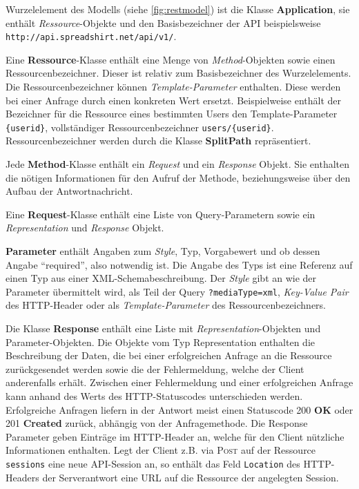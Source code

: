 Wurzelelement des Modells (siehe \cref{fig:restmodel}) ist die Klasse \textbf{Application}, sie enthält \emph{Ressource}-Objekte und den Basisbezeichner der \gls{API} beispielsweise \texttt{\small http://api.spreadshirt.net/api/v1/}. 

Eine \textbf{Ressource}-Klasse enthält eine Menge von \emph{Method}-Objekten sowie einen Ressourcenbezeichner. Dieser ist relativ zum Basisbezeichner des Wurzelelements. Die Ressourcenbezeichner können \emph{Template-Parameter} enthalten. Diese werden bei einer Anfrage durch einen konkreten Wert ersetzt. Beispielweise enthält der Bezeichner für die Ressource eines bestimmten Users den Template-Parameter \texttt{\{userid\}}, vollständiger Ressourcenbezeichner \texttt{users/\{userid\}}. Ressourcenbezeichner werden durch die Klasse \textbf{SplitPath} repräsentiert. 

Jede \textbf{Method}-Klasse enthält ein \emph{Request} und ein \emph{Response} Objekt. Sie enthalten die nötigen Informationen für den Aufruf der Methode, beziehungsweise über den Aufbau der Antwortnachricht.

Eine \textbf{Request}-Klasse enthält eine Liste von Query-Parametern sowie ein \emph{Representation} und \emph{Response} Objekt.

\textbf{Parameter} enthält Angaben zum \emph{Style}, Typ, Vorgabewert und ob dessen Angabe \enquote{required}, also notwendig ist. Die Angabe des Typs ist eine Referenz auf einen Typ aus einer \gls{XML}-Schemabeschreibung. Der \emph{Style} gibt an wie der Parameter übermittelt wird, als Teil der Query \texttt{?mediaType=xml}, \emph{Key-Value Pair} des \gls{HTTP}-Header oder als \emph{Template-Parameter} des Ressourcenbezeichners. 

Die Klasse \textbf{Response} enthält eine Liste mit \emph{Representation}-Objekten und Parameter-Objekten. Die Objekte vom Typ Representation enthalten die Beschreibung der Daten, die bei einer erfolgreichen Anfrage an die Ressource zurückgesendet werden sowie die der Fehlermeldung, welche der Client anderenfalls erhält. Zwischen einer Fehlermeldung und einer erfolgreichen Anfrage kann anhand des Werts des \gls{HTTP}-Statuscodes unterschieden werden. Erfolgreiche Anfragen liefern in der Antwort meist einen Statuscode 200 \textbf{OK} oder 201 \textbf{Created} zurück, abhängig von der Anfragemethode. Die Response Parameter geben Einträge im \gls{HTTP}-Header an, welche für den Client nützliche Informationen enthalten. Legt der Client z.B. via \textsc{Post} auf der Ressource \texttt{sessions} eine neue \gls{API}-Session an, so enthält das Feld \texttt{Location} des \gls{HTTP}-Headers der Serverantwort eine \gls{URL} auf die Ressource der angelegten Session.

